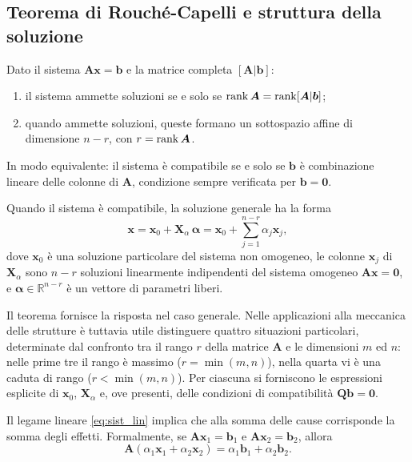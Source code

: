 \subsection{Teorema di Rouch\'e-Capelli e struttura della soluzione}

\begin{teorema}
	Dato il sistema $\bm{A}\bm{x}=\bm{b}$ e la matrice completa $[\bm{A}|\bm{b}]$:
	\begin{enumerate}[label=(\roman*)]
		\item il sistema ammette soluzioni se e solo se $\operatorname{rank}\bm{A}=\operatorname{rank}[\bm{A}|\bm{b}]$;
		\item quando ammette soluzioni, queste formano un sottospazio affine di dimensione $n-r$, con $r=\operatorname{rank}\bm{A}$.
	\end{enumerate}
\end{teorema}

\noindent In modo equivalente: il sistema \`e compatibile se e solo se
$\bm{b}$ \`e combinazione lineare delle colonne di $\bm{A}$, condizione
sempre verificata per $\bm{b}=\bm{0}$.

Quando il sistema \`e compatibile, la soluzione generale ha la forma
\begin{equation}\label{eq:sol_gen}
	\bm{x} = \bm{x}_0 + \bm{X}_{\alpha}\,\bm{\alpha}
	= \bm{x}_0 + \sum_{j=1}^{n-r} \alpha_j \bm{x}_j ,
\end{equation}
dove $\bm{x}_0$ \`e una soluzione particolare del sistema non omogeneo, le
colonne $\bm{x}_j$ di $\bm{X}_{\alpha}$ sono $n-r$ soluzioni linearmente
indipendenti del sistema omogeneo $\bm{A}\bm{x}=\bm{0}$, e
$\bm{\alpha} \in \mathbb{R}^{n-r}$ \`e un vettore di parametri liberi.


Il teorema fornisce la risposta nel caso generale. Nelle applicazioni alla meccanica delle strutture è tuttavia utile distinguere quattro situazioni particolari, determinate dal confronto tra il rango $r$ della matrice $\bm{A}$ e le dimensioni $m$ ed $n$: nelle prime tre il rango è massimo ($r=\min(m,n)$), nella quarta vi è una caduta di rango ($r<\min(m,n)$). Per ciascuna si forniscono le espressioni esplicite di $\bm{x}_0$, $\bm{X}_\alpha$ e, ove presenti, delle condizioni di compatibilità $\bm{Q}\bm{b}=\bm{0}$.


\begin{oss}
	Il legame lineare \eqref{eq:sist_lin} implica che alla somma delle cause corrisponde la somma degli effetti. Formalmente, se $\bm{A}\bm{x}_1 = \bm{b}_1$ e $\bm{A}\bm{x}_2 = \bm{b}_2$, allora
	\begin{equation}
		\bm{A}(\alpha_1\bm{x}_1 + \alpha_2\bm{x}_2) = \alpha_1\bm{b}_1 + \alpha_2\bm{b}_2.
	\end{equation}
\end{oss}


